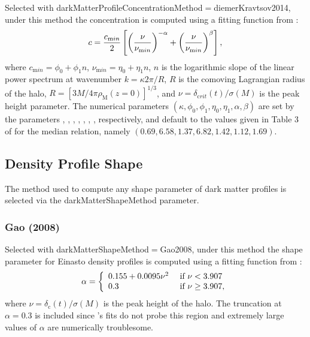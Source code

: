 Selected with {\normalfont \ttfamily darkMatterProfileConcentrationMethod}$=${\normalfont \ttfamily diemerKravtsov2014}, under this method the concentration is computed using a fitting function from \cite{diemer_universal_2014}:
\begin{equation}
c = {c_{\mathrm min} \over 2} \left[ \left({\nu\over\nu_{\mathrm min}}\right)^{-\alpha} + \left({\nu\over\nu_{\mathrm min}}\right)^{\beta} \right],
\end{equation}
where $c_{\mathrm min}=\phi_0+\phi_1 n$, $\nu_{\mathrm min}=\eta_0+\eta_1 n$, $n$ is the logarithmic slope of the linear power spectrum at wavenumber $k = \kappa 2 \pi / R$, $R$ is the comoving Lagrangian radius of the halo, $R=[3 M / 4 \pi \rho_{\mathrm M}(z=0)]^{1/3}$, and $\nu=\delta_{\mathrm crit}(t)/\sigma(M)$ is the peak height parameter. The numerical parameters $(\kappa,\phi_0,\phi_1,\eta_0,\eta_1,\alpha,\beta)$ are set by the parameters {\normalfont {}},  {\normalfont {}},  {\normalfont {}},  {\normalfont {}},  {\normalfont {}},  {\normalfont {}},  {\normalfont {}}, respectively, and default to the values given in Table 3 of \cite{diemer_universal_2014} for the median relation, namely $(0.69,6.58,1.37,6.82,1.42,1.12,1.69)$.

\subsection{Density Profile Shape}\label{sec:DarkMatterProfileShape}

The method used to compute any shape parameter of dark matter profiles is selected via the {\normalfont \ttfamily darkMatterShapeMethod} parameter.

\subsubsection{Gao (2008)}

Selected with {\normalfont \ttfamily darkMatterShapeMethod}$=${\normalfont \ttfamily Gao2008}, under this method the shape parameter for Einasto density profiles is computed using a fitting function from \cite{gao_redshift_2008}:
\begin{equation}
\alpha = \left\{ \begin{array}{ll} 0.155 + 0.0095\nu^2 & \hbox{ if } \nu < 3.907 \\ 0.3 & \hbox{ if } \nu \ge 3.907, \end{array} \right.
\end{equation}
where $\nu=\delta_{\mathrm c}(t)/\sigma(M)$ is the peak height of the halo. The truncation at $\alpha = 0.3$ is included since \cite{gao_redshift_2008}'s fits do not probe this region and extremely large values of $\alpha$ are numerically troublesome.


